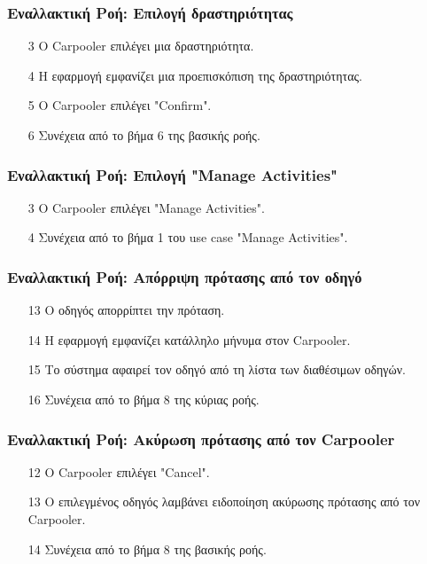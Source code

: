 \subsubsection{Εναλλακτική Ροή: Επιλογή δραστηριότητας}

\begin{enumerate}
    \item[3] O Carpooler επιλέγει μια δραστηριότητα.
    \item[4] Η εφαρμογή εμφανίζει μια προεπισκόπιση της δραστηριότητας.
    \item[5] O Carpooler επιλέγει "Confirm".
    \item[6] Συνέχεια από το βήμα 6 της βασικής ροής.
\end{enumerate}

\subsubsection{Εναλλακτική Ροή: Επιλογή "Manage Activities"}

\begin{enumerate}
    \item[3] O Carpooler επιλέγει "Manage Activities".
    \item[4] Συνέχεια από το βήμα 1 του use case "Manage Activities".
\end{enumerate}

\subsubsection{Εναλλακτική Ροή: Απόρριψη πρότασης από τον οδηγό}

\begin{enumerate}
    \item[13] Ο οδηγός απορρίπτει την πρόταση.
    \item[14] Η εφαρμογή εμφανίζει κατάλληλο μήνυμα στον Carpooler.
    \item[15] Το σύστημα αφαιρεί τον οδηγό από τη λίστα των διαθέσιμων οδηγών.
    \item[16] Συνέχεια από το βήμα 8 της κύριας ροής.
\end{enumerate}

\subsubsection{Εναλλακτική Ροή: Ακύρωση πρότασης από τον Carpooler}

\begin{enumerate}
    \item[12] O Carpooler επιλέγει "Cancel".
    \item[13] Ο επιλεγμένος οδηγός λαμβάνει ειδοποίηση ακύρωσης πρότασης από τον Carpooler.
    \item[14] Συνέχεια από το βήμα 8 της βασικής ροής.
\end{enumerate}

